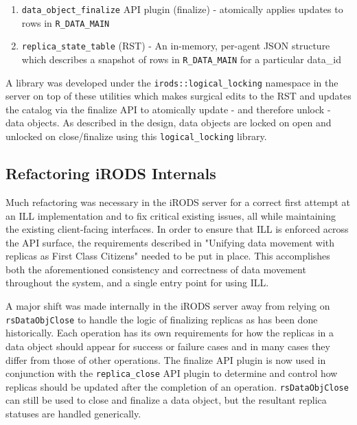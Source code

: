 \documentclass{irodsugm}
\begin{document}
\begin{enumerate}
\item \texttt{data\_object\_finalize} API plugin (finalize) - atomically applies updates to rows in \texttt{R\_DATA\_MAIN}
\item \texttt{replica\_state\_table} (RST) - An in-memory, per-agent JSON structure which describes a snapshot of rows in \texttt{R\_DATA\_MAIN} for a particular data\_id
\end{enumerate}

A library was developed under the \texttt{irods::logical\_locking} namespace in the server on top of these utilities which makes surgical edits to the RST and updates the catalog via the finalize API to atomically update - and therefore unlock - data objects. As described in the design, data objects are locked on open and unlocked on close/finalize using this \texttt{logical\_locking} library.

\subsection*{Refactoring iRODS Internals}
Much refactoring was necessary in the iRODS server for a correct first attempt at an ILL implementation and to fix critical existing issues, all while maintaining the existing client-facing interfaces. In order to ensure that ILL is enforced across the API surface, the requirements described in "Unifying data movement with replicas as First Class Citizens" needed to be put in place. This accomplishes both the aforementioned consistency and correctness of data movement throughout the system, and a single entry point for using ILL.

A major shift was made internally in the iRODS server away from relying on \texttt{rsDataObjClose} to handle the logic of finalizing replicas as has been done historically. Each operation has its own requirements for how the replicas in a data object should appear for success or failure cases and in many cases they differ from those of other operations. The finalize API plugin is now used in conjunction with the \texttt{replica\_close} API plugin to determine and control how replicas should be updated after the completion of an operation. \texttt{rsDataObjClose} can still be used to close and finalize a data object, but the resultant replica statuses are handled generically.
\end{document}
